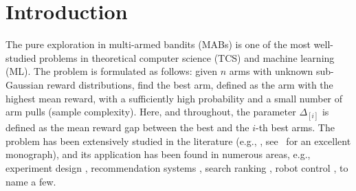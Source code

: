 \renewenvironment{quote}
{\list{}{\rightmargin=0.5cm \leftmargin=0.5cm}%
	\item\relax}
{\endlist}

\section{Introduction}
\label{sec:intro}
The pure exploration in multi-armed bandits (MABs) is one of the most well-studied problems in theoretical computer science (TCS) and machine learning (ML). The problem is formulated as follows: given $n$ arms with unknown sub-Gaussian reward distributions, find the best arm, defined as the arm with the highest mean reward, with a sufficiently high probability and a small number of arm pulls (sample complexity). Here, and throughout, the parameter $\Delta_{[i]}$ is defined as the mean reward gap between the best and the $i$-th best arms. The problem has been extensively studied in the literature (e.g., \cite{Even-Dar+02,MannorTs04,KalyanakrishnanSt10,KarninKS13,JamiesonMNB14,KCG16,CL16,AgarwalAAK17,ChenLQ17}, see~\cite{Slivkins19} for an excellent monograph), and its application has been found in numerous areas, e.g., experiment design \cite{Robbins52,villar2015multi,aziz2021multi}, recommendation systems \cite{silva2022multi}, search ranking \cite{AgarwalCEMPRRZ08,radlinski2008learning}, robot control \cite{KovalKPS15}, to name a few. 

